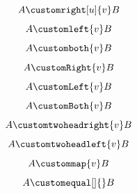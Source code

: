 \documentclass{article}
\begin{document}
\[ A \customright[u]{v} B \]
\[ A \customleft{v} B \]
\[ A \customboth{v} B \]
\[ A \customRight{v} B \]
\[ A \customLeft{v} B \]
\[ A \customBoth{v} B \]
\[ A \customtwoheadright{v} B \]
\[ A \customtwoheadleft{v} B \]
\[ A \custommap{v} B \]
\[ A \customequal[]{} B \]
\end{document}
